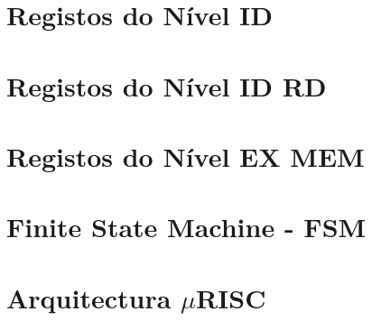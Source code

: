 \section{Registos do Nível ID}

\section{Registos do Nível ID RD}

\section{Registos do Nível EX MEM}

\section{Finite State Machine - FSM}

\section{Arquitectura $\mu$RISC}


